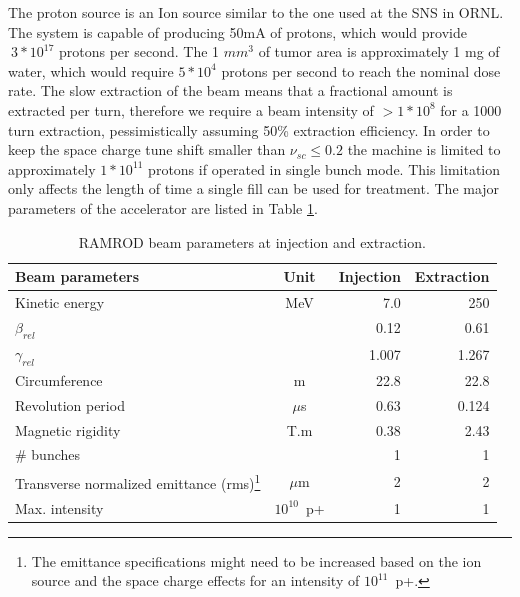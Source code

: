 The proton source is an Ion source similar to the one used at the SNS in ORNL.  The system is capable of producing 50mA of protons, 
which would provide $~3*10^{17}$ protons per second.  The 1 $mm^3$ of tumor area is approximately 1 mg of water, which would require $5*10^4$ protons per second to 
reach the nominal dose rate.  The slow extraction of the beam means that a fractional amount is extracted per turn, therefore we require a beam intensity of 
$>1*10^8$ for a 1000 turn extraction, pessimistically assuming 50\% extraction efficiency.  In order to keep the space charge tune shift smaller than 
$\nu_{sc} \le 0.2$ the machine is limited to approximately $1*10^{11}$ protons if operated in single bunch mode. This limitation 
only affects the length of time a single fill can be used for treatment. 
The major parameters of the accelerator are listed in Table \ref{tab:major}.  
\begin{table}[!hbt]
  \centering
  \begin{tabular}{lcrr}
    \hline 
    \textbf{Beam parameters}&\textbf{Unit}  &\textbf{Injection} &\textbf{Extraction}\\                        
    \hline \hline
    Kinetic energy      & MeV       & 7.0       & 250       \\
    $\beta_{rel}$     &       & 0.12 & 0.61   \\
    $\gamma_{rel}$      &       & 1.007         &1.267  \\
    Circumference   & m   &   22.8      & 22.8    \\
    Revolution period   & $\mu$s    & 0.63        &0.124    \\
    Magnetic rigidity   & T.m     & 0.38        &2.43 \\
    $\#$ bunches      &       &1        &1  \\
    Transverse normalized emittance (rms)\footnote{The emittance specifications might need to be increased based on the ion source and the space charge 
    effects for an intensity of $10^{11}$~p+. } & $\mu$m    & 2       &2\\
    Max. intensity  &   $10^{10}$~p+  &   1   & 1\\

    \hline
  \end{tabular}
  \caption{RAMROD beam parameters at injection and extraction.}
  \label{tab:major}
\end{table}



